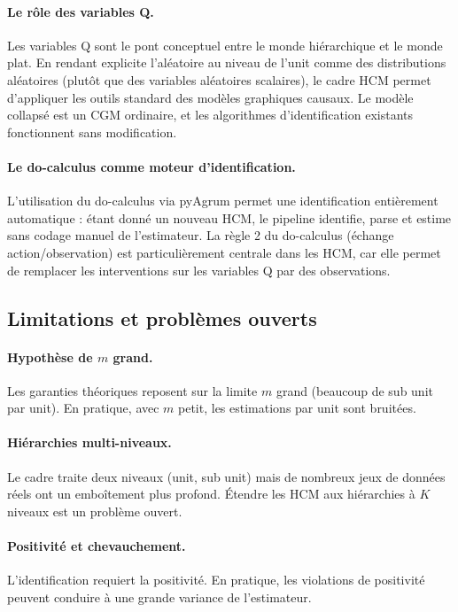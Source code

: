 \documentclass[11pt,a4paper]{article}
\begin{document}
\paragraph{Le rôle des variables Q.}
Les variables Q sont le pont conceptuel entre le monde hiérarchique et le monde plat.
En rendant explicite l'aléatoire au niveau de l'unit comme des distributions aléatoires (plutôt que des variables aléatoires scalaires), le cadre HCM permet d'appliquer les outils standard des modèles graphiques causaux.
Le modèle collapsé est un CGM ordinaire, et les algorithmes d'identification existants fonctionnent sans modification.

\paragraph{Le do-calculus comme moteur d'identification.}
L'utilisation du do-calculus via pyAgrum permet une identification entièrement automatique : étant donné un nouveau HCM, le pipeline identifie, parse et estime sans codage manuel de l'estimateur.
La règle 2 du do-calculus (échange action/observation) est particulièrement centrale dans les HCM, car elle permet de remplacer les interventions sur les variables Q par des observations.

\subsection{Limitations et problèmes ouverts}

\paragraph{Hypothèse de $m$ grand.}
Les garanties théoriques reposent sur la limite $m$ grand (beaucoup de sub unit par unit).
En pratique, avec $m$ petit, les estimations par unit sont bruitées.

\paragraph{Hiérarchies multi-niveaux.}
Le cadre traite deux niveaux (unit, sub unit) mais de nombreux jeux de données réels ont un emboîtement plus profond.
Étendre les HCM aux hiérarchies à $K$ niveaux est un problème ouvert.

\paragraph{Positivité et chevauchement.}
L'identification requiert la positivité. En pratique, les violations de positivité peuvent conduire à une grande variance de l'estimateur.
\end{document}
